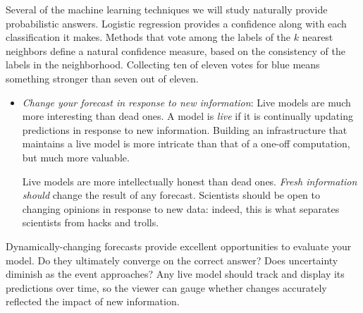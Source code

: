 \documentclass[10pt]{article}
\begin{document}
Several of the machine learning techniques we will study naturally provide probabilistic answers. Logistic regression provides a confidence along with each classification it makes. Methods that vote among the labels of the \(k\) nearest neighbors define a natural confidence measure, based on the consistency of the labels in the neighborhood. Collecting ten of eleven votes for blue means something stronger than seven out of eleven.

\begin{itemize}
  \item \textit{Change your forecast in response to new information}: Live models are much more interesting than dead ones. A model is \textit{live} if it is continually updating predictions in response to new information. Building an infrastructure that maintains a live model is more intricate than that of a one-off computation, but much more valuable.
  
  Live models are more intellectually honest than dead ones. \textit{Fresh information should} change the result of any forecast. Scientists should be open to changing opinions in response to new data: indeed, this is what separates scientists from hacks and trolls.
\end{itemize}

Dynamically-changing forecasts provide excellent opportunities to evaluate your model. Do they ultimately converge on the correct answer? Does uncertainty diminish as the event approaches? Any live model should track and display its predictions over time, so the viewer can gauge whether changes accurately reflected the impact of new information.
\end{document}
